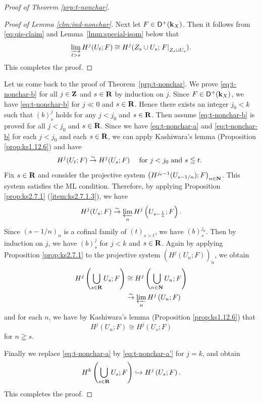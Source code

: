\begin{proof}[{Proof of Theorem \ref{prp:t-nonchar}}]
\begin{proof}[Proof of Lemma \ref{clm:ind-nonchar}]
    Next let \(F\in\Dompl(\kk_X)\). 
    Then it follows from \eqref{eq:qis-claim} and Lemma~\ref{lmm:special-isom} below 
    that 
    \[
      \indlim[t>s]H^{j}(U_t;F)
      \cong
      H^{j}(Z_{s}\cup U_{s};\mres[F]{Z_{s}\cup U_{s}}).
    \]
    This completes the proof.
  \end{proof}

  Let us come back to the proof of 
  Theorem~\ref{prp:t-nonchar}. 
  We prove \ref{eq:t-nonchar-b} for 
  all \(j\in\zz\) and \(s\in\rr\) by induction on \(j\). 
  Since \(F\in\Dompl(\kk_X)\), 
  we have \ref{eq:t-nonchar-b} for \(j\ll 0\) and \(s\in\rr\). 
  Hence there exists an integer \(j_{0}<k\) 
  such that \((b)_{s}^{j}\) holds 
  for any \(j<j_{0}\) and \(s\in\rr\).  
  Then assume \ref{eq:t-nonchar-b} is proved for 
  all \(j< j_{0}\) and \(s\in\rr\). 
  Since we have \ref{eq:t-nonchar-a} and \ref{eq:t-nonchar-b} 
  for each \(j< j_{0}\) and each \(s\in\rr\), 
  we can apply 
  Kashiwara's lemma (Proposition \ref{prop:ks1.12.6}) 
  and have\[
    H^{j}(U_{t};F)\simar H^{j}(U_{s};F) 
    \quad
    \text{ for \(j< j_{0}\) and \(s\leqq t\). }
  \]
  Fix \(s\in\rr\) and consider the projective system \(
    \left(H^{j_{0}-1}(U_{s-1/n});F\right)_{n\in\nn}
  \). This system satisfies the ML condition.  
  Therefore, by applying 
  Proposition \ref{prop:ks2.7.1} (\ref{item:ks2.7.1.3}), 
  we have \[
    H^{j}(U_{s};F)
    \simar 
    \prolim[n]H^{j}\left(U_{s-\frac{1}{n}};F\right). 
  \]
  Since \((s-1/n)_{n}\) is a cofinal family of \((t)_{s>t}\), 
  we have \((b)_{s}^{j_{0}}\). 
  Then by induction on \(j\), 
  we have \((b)_{s}^{j}\) for \(j<k\) and \(s\in\rr\). 
  Again by applying Proposition \ref{prop:ks2.7.1} to the 
  projective system \(\left(H^{j}(U_{n};F)\right)_{n}\), 
  we obtain 
  \begin{align*}
    H^{j}\left(\bigcup_{s\in\rr}U_{s};F\right)
    &\cong
    H^{j}\left(\bigcup_{n\in\nn}U_{n};F\right)\\
    &\simar 
    \prolim[n]H^{j}\left(U_{n};F\right)
  \end{align*}
  and for each \(n\), we have by Kashiwara's lemma 
  (Proposition \ref{prop:ks1.12.6}) that
  \[
    H^{j}\left(U_{n};F\right)
    \cong
    H^{j}(U_{s};F)
  \]
  for \(n\geqq s\).

  Finally we replace \ref{eq:t-nonchar-a} by 
  \ref{eq:t-nonchar-a'} for \(j=k\), and obtain
  \[
    H^{k}\left(\bigcup_{s\in\rr}U_{s};F\right)
    \hookrightarrow
    H^{j}\left(U_{s};F\right).
  \]
  This completes the proof. 
\end{proof}

